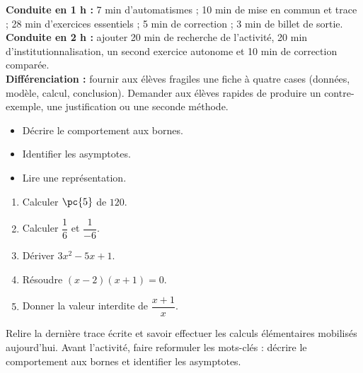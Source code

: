 \ifmxteacher
\begin{method}
\textbf{Conduite en 1 h :} 7 min d'automatismes ; 10 min de mise en commun et trace ; 28 min d'exercices essentiels ; 5 min de correction ; 3 min de billet de sortie.\\
\textbf{Conduite en 2 h :} ajouter 20 min de recherche de l'activité, 20 min d'institutionnalisation, un second exercice autonome et 10 min de correction comparée.\\
\textbf{Différenciation :} fournir aux élèves fragiles une fiche à quatre cases (données, modèle, calcul, conclusion). Demander aux élèves rapides de produire un contre-exemple, une justification ou une seconde méthode.
\end{method}
\fi
{}
\begin{objectives}\begin{itemize}\item Décrire le comportement aux bornes.\item Identifier les asymptotes.\item Lire une représentation.\end{itemize}\end{objectives}
\begin{fluency}\begin{enumerate}\item Calculer $\pc{5}$ de $120$. \item Calculer $\dfrac1{6}$ et $\dfrac1{-6}$. \item Dériver $3x^2-5x+1$. \item Résoudre $(x-2)(x+1)=0$. \item Donner la valeur interdite de $\dfrac{x+1}{x}$. \end{enumerate}\end{fluency}
\begin{prerequisites}Relire la dernière trace écrite et savoir effectuer les calculs élémentaires mobilisés aujourd'hui. Avant l'activité, faire reformuler les mots-clés : décrire le comportement aux bornes et identifier les asymptotes.\end{prerequisites}


